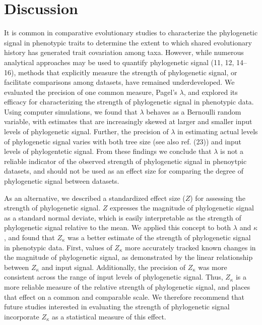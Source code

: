 \documentclass[9pt,twocolumn,twoside,lineno]{pnas-new}
\begin{document}
\hypertarget{discussion}{%
\section{Discussion}\label{discussion}}

It is common in comparative evolutionary studies to characterize the
phylogenetic signal in phenotypic traits to determine the extent to
which shared evolutionary history has generated trait covariation among
taxa. However, while numerous analytical approaches may be used to
quantify phylogenetic signal (11, 12, 14--16), methods that explicitly
measure the strength of phylogenetic signal, or facilitate comparisons
among datasets, have remained underdeveloped. We evaluated the precision
of one common measure, Pagel's \(\lambda\), and explored its efficacy
for characterizing the strength of phylogenetic signal in phenotypic
data. Using computer simulations, we found that \(\lambda\) behaves as a
Bernoulli random variable, with estimates that are increasingly skewed
at larger and smaller input levels of phylogenetic signal. Further, the
precision of \(\lambda\) in estimating actual levels of phylogenetic
signal varies with both tree size (see also ref. (23)) and input levels
of phylogentetic signal. From these findings we conclude that
\(\lambda\) is not a reliable indicator of the observed strength of
phylogenetic signal in phenoytpic datasets, and should not be used as an
effect size for comparing the degree of phylogenetic signal between
datasets.

As an alternative, we described a standardized effect size (\(Z\)) for
assessing the strength of phylogenetic signal. \(Z\) expresses the
magnitude of phylogenetic signal as a standard normal deviate, which is
easily interpretable as the strength of phylogenetic signal relative to
the mean. We applied this concept to both \(\lambda\) and \(\kappa\),
and found that \(Z_\kappa\) was a better estimate of the strength of
phylogenetic signal in phenotypic data. First, values of \(Z_\kappa\)
more accurately tracked known changes in the magnitude of phylogenetic
signal, as demonstrated by the linear relationship between \(Z_\kappa\)
and input signal. Additionally, the precision of \(Z_{\kappa}\) was more
consistent across the range of input levels of phylogenetic signal.
Thus, \(Z_\kappa\) is a more reliable measure of the relative strength
of phylogenetic signal, and places that effect on a common and
comparable scale. We therefore recommend that future studies interested
in evaluating the strength of phylogenetic signal incorporate
\(Z_\kappa\) as a statistical measure of this effect.
\end{document}
